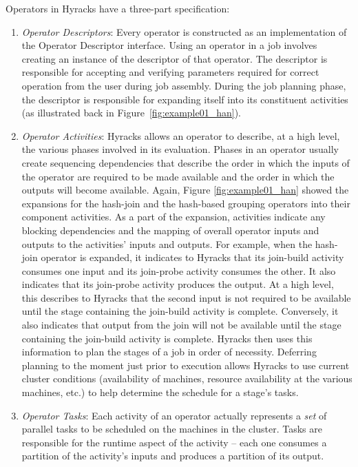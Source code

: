 Operators in Hyracks have a three-part specification:
\begin{enumerate}
\item \emph{Operator Descriptors}: Every operator is constructed as an implementation of the Operator Descriptor interface.
Using an operator in a job involves creating an instance of the descriptor of that operator.
The descriptor is responsible for accepting and verifying parameters required for correct operation from the user during job assembly.
During the job planning phase, the descriptor is responsible for expanding itself into its constituent activities (as illustrated back in Figure~\ref{fig:example01_han}).
\item \emph{Operator Activities}: Hyracks allows an operator to describe, at a high level, the various phases involved in its evaluation.
Phases in an operator usually create sequencing dependencies that describe the order in which the inputs of the operator
are required to be made available and the order in which the outputs will become available.
Again, Figure \ref{fig:example01_han} showed the expansions for the hash-join and the hash-based grouping operators into their component activities.
As a part of the expansion, activities indicate any blocking dependencies and the mapping of overall operator inputs and outputs to the activities' inputs and outputs.
For example, when the hash-join operator is expanded, it indicates to Hyracks that its join-build activity consumes one input and its join-probe activity consumes the other.
It also indicates that its join-probe activity produces the output.
At a high level, this describes to Hyracks that the second input is not required to be available until the stage containing the join-build activity is complete.
Conversely, it also indicates that output from the join will not be available until the stage containing the join-build activity is complete.
Hyracks then uses this information to plan the stages of a job in order of necessity.
Deferring planning to the moment just prior to execution allows Hyracks to use current cluster conditions
(availability of machines, resource availability at the various machines, etc.) to help determine the schedule for a stage's tasks.
\item \emph{Operator Tasks}: Each activity of an operator actually represents a \emph{set} of parallel tasks to be scheduled on the machines in the cluster.
Tasks are responsible for the runtime aspect of the activity -- each one consumes a partition of the activity's inputs and produces a partition of its output.

\end{enumerate}
